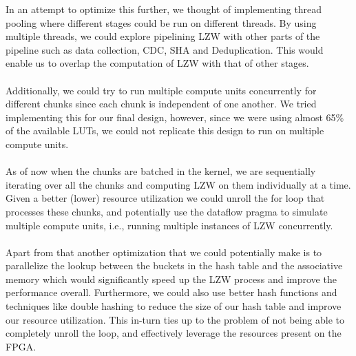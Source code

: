 \documentclass[../main.tex]{subfiles}
\begin{document}
\noindent In an attempt to optimize this further, we thought of implementing thread pooling where different stages could be run on different threads. By using multiple threads, we could explore pipelining LZW with other parts of the pipeline such as data collection, CDC, SHA and Deduplication. This would enable us to overlap the computation of LZW with that of other stages. \\ \\
Additionally, we could try to run multiple compute units concurrently for different chunks since each chunk is independent of one another. We tried implementing this for our final design, however, since we were using almost 65\% of the available LUTs, we could not replicate this design to run on multiple compute units. \\ \\
As of now when the chunks are batched in the kernel, we are sequentially iterating over all the chunks and computing LZW on them individually at a time. Given a better (lower) resource utilization we could unroll the for loop that processes these chunks, and potentially use the dataflow pragma to simulate multiple compute units, i.e., running multiple instances of LZW concurrently.\\ \\
Apart from that another optimization that we could potentially make is to parallelize the lookup between the buckets in the hash table and the associative memory which would significantly speed up the LZW process and improve the performance overall. Furthermore, we could also use better hash functions and techniques like double hashing to reduce the size of our hash table and improve our resource utilization. This in-turn ties up to the problem of not being able to completely unroll the loop, and effectively leverage the resources present on the FPGA.
\end{document}
